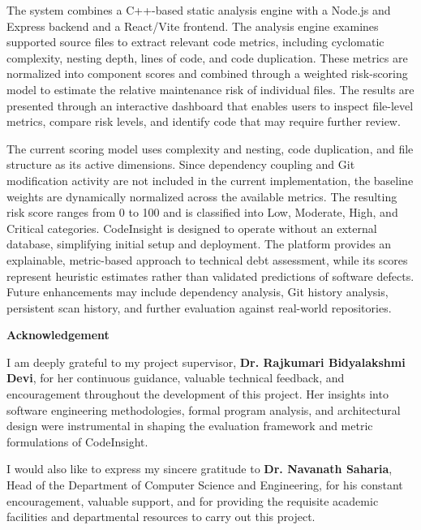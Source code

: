 \documentclass[12pt,a4paper]{report}
\begin{document}
The system combines a C++-based static analysis engine with a Node.js and Express backend and a React/Vite frontend. The analysis engine examines supported source files to extract relevant code metrics, including cyclomatic complexity, nesting depth, lines of code, and code duplication. These metrics are normalized into component scores and combined through a weighted risk-scoring model to estimate the relative maintenance risk of individual files. The results are presented through an interactive dashboard that enables users to inspect file-level metrics, compare risk levels, and identify code that may require further review.

The current scoring model uses complexity and nesting, code duplication, and file structure as its active dimensions. Since dependency coupling and Git modification activity are not included in the current implementation, the baseline weights are dynamically normalized across the available metrics. The resulting risk score ranges from 0 to 100 and is classified into Low, Moderate, High, and Critical categories. CodeInsight is designed to operate without an external database, simplifying initial setup and deployment. The platform provides an explainable, metric-based approach to technical debt assessment, while its scores represent heuristic estimates rather than validated predictions of software defects. Future enhancements may include dependency analysis, Git history analysis, persistent scan history, and further evaluation against real-world repositories.

\newpage
\thispagestyle{plain}
{}
\begin{center}
    {\LARGE \textbf{Acknowledgement}\par}
\end{center}
\vspace{1.0cm}

I am deeply grateful to my project supervisor, \textbf{Dr. Rajkumari Bidyalakshmi Devi}, for her continuous guidance, valuable technical feedback, and encouragement throughout the development of this project. Her insights into software engineering methodologies, formal program analysis, and architectural design were instrumental in shaping the evaluation framework and metric formulations of CodeInsight.

I would also like to express my sincere gratitude to \textbf{Dr. Navanath Saharia}, Head of the Department of Computer Science and Engineering, for his constant encouragement, valuable support, and for providing the requisite academic facilities and departmental resources to carry out this project.
\end{document}
